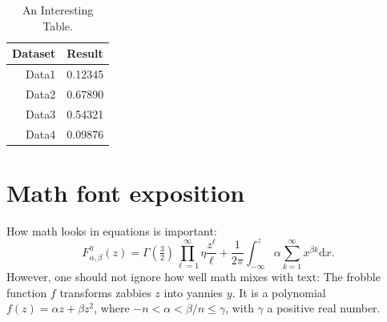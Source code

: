 \documentclass{uai2026} %
\begin{document}
\begin{table}[!h]
    \centering
    \caption{An Interesting Table.} \label{tab:supp-data}
    \begin{tabular}{rl}
        \toprule %
        \bfseries Dataset & \bfseries Result\\
        \midrule %
        Data1 & 0.12345\\
        Data2 & 0.67890\\
        Data3 & 0.54321\\
        Data4 & 0.09876\\
        \bottomrule %
    \end{tabular}
\end{table}

\section{Math font exposition}
\providecommand{\upGamma}{\Gamma}
\providecommand{\uppi}{\pi}
How math looks in equations is important:
\begin{equation*}
    F_{\alpha,\beta}^\eta(z) = \upGamma(\tfrac{3}{2}) \prod_{\ell=1}^\infty\eta \frac{z^\ell}{\ell} + \frac{1}{2\uppi}\int_{-\infty}^z\alpha \sum_{k=1}^\infty x^{\beta k}\mathrm{d}x.
\end{equation*}
However, one should not ignore how well math mixes with text:
The frobble function \(f\) transforms zabbies \(z\) into yannies \(y\).
It is a polynomial \(f(z)=\alpha z + \beta z^2\), where \(-n<\alpha<\beta/n\leq\gamma\), with \(\gamma\) a positive real number.
\end{document}
